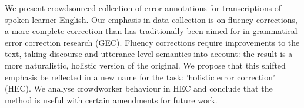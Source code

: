 We present crowdsourced collection of error annotations for transcriptions of spoken learner English. Our emphasis in data collection is on fluency corrections, a more complete correction than has traditionally been aimed for in grammatical error correction research (GEC). Fluency corrections require improvements to the text, taking discourse and utterance level semantics into account: the result is a more naturalistic, holistic version of the original. We propose that this shifted emphasis be reflected in a new name for the task: 'holistic error correction' (HEC). We analyse crowdworker behaviour in HEC and conclude that the method is useful with certain amendments for future work.
